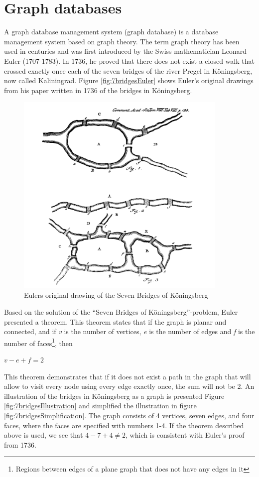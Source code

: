 \section{Graph databases}
\label{sec:graphdb}
A graph database management system (graph database) \citep{robinson13} is a database management system based on graph theory. The term graph theory has been used in centuries and was first introduced by the Swiss mathematician Leonard Euler (1707-1783). In 1736, he proved that there does not exist a closed walk that crossed exactly once each of the seven bridges of the river Pregel in Köningsberg, now called Kaliningrad\citep{alexanderson06}. Figure \vref{fig:7bridgesEuler} shows Euler's original drawings from his paper written in 1736 \citep{euler1741} of the bridges in Köningsberg. 

\begin{figure}[H]
  \centering
  \includegraphics[width=4in]{assets/7bridges-euler.png}
  \caption{Eulers original drawing of the Seven Bridges of Köningsberg} 
  \label{fig:7bridgesEuler}
\end{figure}

Based on the solution of the ``Seven Bridges of Köningsberg''-problem, Euler presented a theorem. This theorem states that if the graph is planar and connected, and if \textit{v} is the number of vertices, \textit{e} is the number of edges and \textit{f} is the number of faces\footnote{Regions between edges of a plane graph that does not have any edges in it}, then 
\newline
\newline
\centerline{$v-e+f=2$}
\newline
\newline
This theorem demonstrates that if it does not exist a path in the graph that will allow to visit every node using every edge exactly once, the sum will not be 2. An illustration of the bridges in Köningsberg as a graph is presented Figure \vref{fig:7bridgesIllustration} and simplified the illustration in figure \vref{fig:7bridgesSimplification}. The graph consists of 4 vertices, seven edges, and four faces, where the faces are specified with numbers 1-4. If the theorem described above is used, we see that $4-7+4\neq2$, which is consistent with Euler's proof from 1736. 


